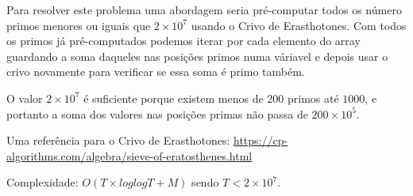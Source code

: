 Para resolver este problema uma abordagem seria pré-computar todos os número primos menores ou iguais que $2 \times 10^7$ usando o Crivo de Erasthotones. Com todos os primos já pré-computados podemos iterar por cada elemento do array guardando a soma daqueles nas posições primos numa váriavel e depois usar o crivo novamente para verificar se essa soma é primo também.

O valor $2 \times 10^7$ é suficiente porque existem menos de $200$ primos até $1000$, e portanto a soma dos valores nas posições primas não passa de $200 \times 10^5$.

Uma referência para o Crivo de Erasthotones: \url{https://cp-algorithms.com/algebra/sieve-of-eratosthenes.html}

Complexidade: $O(T \times log log T + M)$ sendo $T < 2 \times 10^7$.
